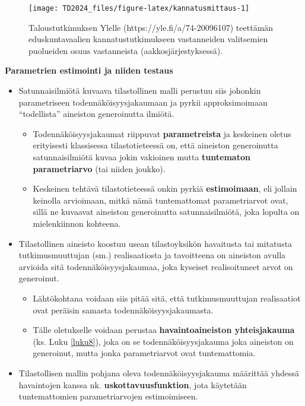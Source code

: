 \documentclass[
]{book}
\providecommand{\tightlist}{%
  \setlength{\itemsep}{0pt}\setlength{\parskip}{0pt}}
\begin{document}
\begin{figure}

{\centering \texttt{[image: TD2024\_files/figure-latex/kannatusmittaus-1]} 

}

\caption{Taloustutkimuksen Ylelle (https://yle.fi/a/74-20096107) teettämän eduskuntavaalien kannatustutkimukseen vastanneiden valitsemien puolueiden osuus vastanneista (aakkosjärjestyksessä).}\label{fig:kannatusmittaus}
\end{figure}

\textbf{Parametrien estimointi ja niiden testaus}

\begin{itemize}
\tightlist
\item
  Satunnaisilmiötä kuvaava tilastollinen malli perustuu siis johonkin parametriseen todennäköisyysjakaumaan ja pyrkii approksimoimaan ``todellista'' aineiston generoinutta ilmiötä.

  \begin{itemize}
  \tightlist
  \item
    Todennäköisyysjakaumat riippuvat \textbf{parametreista} ja keskeinen oletus erityisesti klassisessa tilastotieteessä on, että aineiston generoinutta satunnaisilmiötä kuvaa jokin vakioinen mutta \textbf{tuntematon parametriarvo} (tai niiden joukko).
  \item
    Keskeinen tehtävä tilastotieteessä onkin pyrkiä \textbf{estimoimaan}, eli jollain keinolla arvioimaan, mitkä nämä tuntemattomat parametriarvot ovat, sillä ne kuvaavat aineiston generoinutta satunnaisilmiötä, joka lopulta on mielenkiinnon kohteena.
  \end{itemize}
\item
  Tilastollinen aineisto koostuu usean tilastoyksikön havaitusta tai mitatusta tutkimusmuuttujan (sm.) realisaatiosta ja tavoitteena on aineiston avulla arvioida sitä todennäköisyysjakaumaa, joka kyseiset realisoituneet arvot on generoinut.

  \begin{itemize}
  \tightlist
  \item
    Lähtökohtana voidaan siis pitää sitä, että tutkimusmuuttujan realisaatiot ovat peräisin samasta todennäköisyysjakaumasta.
  \item
    Tälle oletukselle voidaan perustaa \textbf{havaintoaineiston yhteisjakauma} (ks. Luku \ref{luku8}), joka on se todennäköisyysjakauma joka aineiston on generoinut, mutta jonka parametriarvot ovat tuntemattomia.
  \end{itemize}
\item
  Tilastollisen mallin pohjana oleva todennäköisyysjakauma määrittää yhdessä havaintojen kanssa nk. \textbf{uskottavuusfunktion}, jota käytetään tuntemattomien parametriarvojen estimoimiseen.


\end{itemize}
\end{document}
